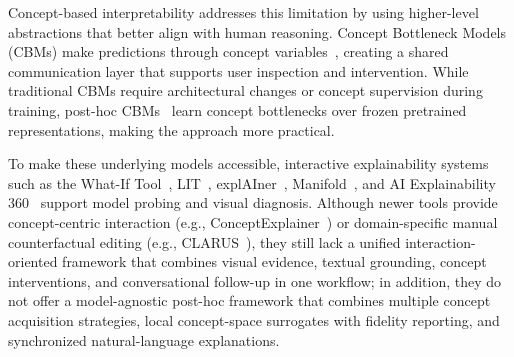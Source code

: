 \documentclass[sigconf,review,screen]{acmart}
\begin{document}

Concept-based interpretability addresses this limitation by using higher-level abstractions that better align with human reasoning. Concept Bottleneck Models (CBMs) make predictions through concept variables~\cite{Koh2020CBM}, creating a shared communication layer that supports user inspection and intervention. While traditional CBMs require architectural changes or concept supervision during training, post-hoc CBMs~\cite{Yuksekgonul2022PCBM} learn concept bottlenecks over frozen pretrained representations, making the approach more practical.


To make these underlying models accessible, interactive explainability systems such as the What-If Tool~\cite{Wexler2020WhatIf}, LIT~\cite{Tenney2020LIT}, explAIner~\cite{Spinner2020explAIner}, Manifold~\cite{Zhang2019Manifold}, and AI Explainability 360~\cite{Arya2020AIX360} support model probing and visual diagnosis. Although newer tools provide concept-centric interaction (e.g., ConceptExplainer~\cite{Huang2023ConceptExplainer}) or domain-specific manual counterfactual editing (e.g., CLARUS~\cite{Metsch2024CLARUS}), they still lack a unified interaction-oriented framework that combines visual evidence, textual grounding, concept interventions, and conversational follow-up in one workflow; in addition, they do not offer a model-agnostic post-hoc framework that combines multiple concept acquisition strategies, local concept-space surrogates with fidelity reporting, and synchronized natural-language explanations.
\end{document}
